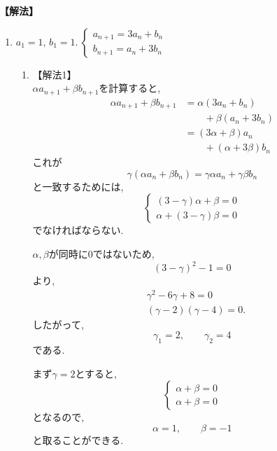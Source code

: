     \noindent\textbf{【解法】}
    \begin{enumerate}[label=(\arabic*),parsep=3pt]
    \item $\displaystyle a_1=1,\,b_1=1.\ \begin{cases}a_{n+1}=3a_n+b_n\\ b_{n+1}=a_n+3b_n\end{cases}$\\
          \begin{enumerate}
            \item 【解法1】\\
                  $\alpha a_{n+1}+\beta b_{n+1}$を計算すると,
                  \begin{align*}
                    \alpha a_{n+1}+\beta b_{n+1}
                      &=\alpha(3a_n+b_n)\\
                      &\qquad +\beta(a_n+3b_n)\\
                      &=(3\alpha+\beta)a_n\\
                      &\qquad +(\alpha+3\beta)b_n
                  \end{align*}
                  これが
                  \[
                    \gamma(\alpha a_n+\beta b_n)
                    =\gamma\alpha a_n+\gamma\beta b_n
                  \]
                  と一致するためには,
                  \[
                  \begin{cases}
                    (3-\gamma)\alpha+\beta=0\\
                    \alpha+(3-\gamma)\beta=0
                  \end{cases}
                  \]
                  でなければならない.

                  $\alpha,\beta$が同時に$0$ではないため,
                  \[
                    (3-\gamma)^2-1=0
                  \]
                  より,
                  \begin{align*}
                    &\gamma^2-6\gamma+8=0\\
                    &(\gamma-2)(\gamma-4)=0.
                  \end{align*}
                  したがって,
                  \[
                    \gamma_1=2,\qquad\gamma_2=4
                  \]
                  である.

                  まず$\gamma=2$とすると,
                  \[
                  \begin{cases}
                    \alpha+\beta=0\\
                    \alpha+\beta=0
                  \end{cases}
                  \]
                  となるので,
                  \[
                    \alpha=1,\qquad\beta=-1
                  \]
                  と取ることができる.


\end{enumerate}
\end{enumerate}

